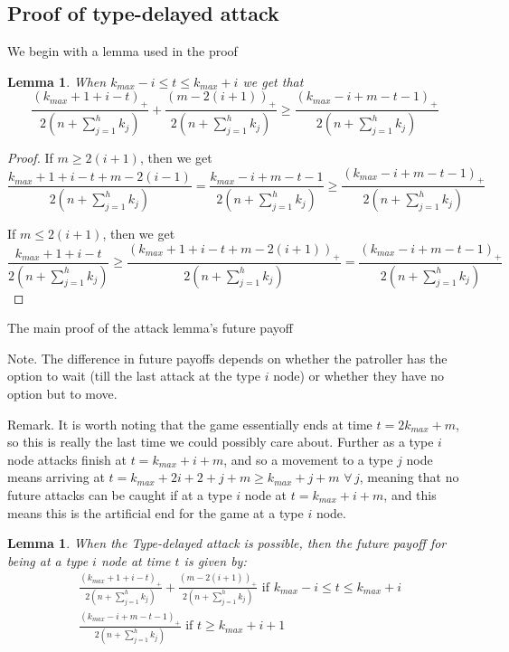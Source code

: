 \documentclass[a4paper,10pt]{article}
\newcommand{\denominator}{\ensuremath{n+\sum\limits_{j=1}^{h} k_{j}}}
\newcommand{\pospart}[1]{\left( #1 \right)_{+}}
\newtheorem{lemma}[theorem]{Lemma}
\theoremstyle{definition}
\theoremstyle{definition}
\theoremstyle{remark}
\theoremstyle{definition}
\begin{document}
\subsection{Proof of type-delayed attack}
\label{Appendix:Proof of type-delayed attack}
We begin with a lemma used in the proof
\begin{lemma}
When $k_{max}-i \leq t \leq k_{max}+i$ we get that
$$\frac{\pospart{k_{max}+1+i-t}}{2 \left( \denominator \right)} + \frac{\pospart{m-2(i+1)}}{2 \left( \denominator \right)} \geq \frac{\pospart{k_{max}-i+m-t-1}}{2 \left( \denominator \right)} $$
\end{lemma}

\begin{proof}
If $m \geq 2(i+1)$, then we get
$$\frac{k_{max}+1+i-t+m-2(i-1)}{2 \left( \denominator \right)}=\frac{k_{max}-i+m-t-1}{2 \left( \denominator \right)} \geq \frac{\pospart{k_{max}-i+m-t-1}}{2 \left( \denominator \right)}$$

If $m \leq 2(i+1)$, then we get
$$\frac{k_{max}+1+i-t}{2 \left( \denominator \right)} \geq \frac{\pospart{k_{max}+1+i-t+m-2(i+1)}}{2 \left( \denominator \right)} =\frac{\pospart{k_{max}-i+m-t-1}}{2 \left( \denominator \right)}$$
\end{proof}

The main proof of the attack lemma's future payoff

Note. The difference in future payoffs depends on whether the patroller has the option to wait (till the last attack at the type $i$ node) or whether they have no option but to move.

Remark. It is worth noting that the game essentially ends at time $t=2k_{max}+m$, so this is really the last time we could possibly care about. Further as a type $i$ node attacks finish at $t=k_{max}+i+m$, and so a movement to a type $j$ node means arriving at $t=k_{max}+2i+2+j+m \geq k_{max}+j+m$ $\forall \, j$, meaning that no future attacks can be caught if at a type $i$ node at $t=k_{max}+i+m$, and this means this is the artificial end for the game at a type $i$ node.

\begin{lemma}
When the Type-delayed attack is possible, then the future payoff for being at a type $i$ node at time $t$ is given by:
\begin{align*}
&\frac{\pospart{k_{max}+1+i-t}}{2 \left( \denominator \right)} + \frac{\pospart{m-2(i+1)}}{2 \left( \denominator \right)} \text{  if } k_{max}-i \leq t \leq k_{max}+i \\
&\frac{\pospart{k_{max}-i+m-t-1}}{2 \left( \denominator \right)} \text{  if } t \geq k_{max}+i+1
\end{align*}
\end{lemma}
\end{document}
